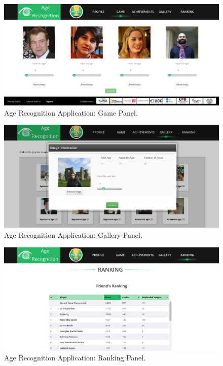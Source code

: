 \begin{figure}[!h]
	\centering
	\includegraphics[width=\textwidth]{figures/age_app_1}
	\caption{Age Recognition Application: Game Panel.}
	\label{fig:game}
\end{figure}

\begin{figure}[!h]
	\centering
	\includegraphics[width=\textwidth]{figures/age_app_2}
	\caption{Age Recognition Application: Gallery Panel.}
	\label{fig:gallery}
\end{figure}

\begin{figure}[!h]
	\centering
	\includegraphics[width=\textwidth]{figures/age_app_3}
	\caption{Age Recognition Application: Ranking Panel.}
	\label{fig:ranking}
\end{figure}

